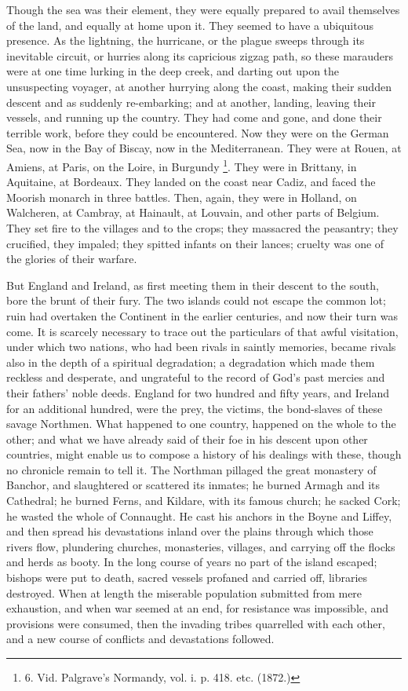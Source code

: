 Though the sea was their
element, they were equally prepared to avail themselves of the land,
and equally at home upon it. They seemed to have a ubiquitous
presence. As the lightning, the hurricane, or the plague sweeps
through its inevitable circuit, or hurries along its capricious zigzag
path, so these marauders were at one time lurking in the deep creek,
and darting out upon the unsuspecting voyager, at another hurrying
along the coast, making their sudden descent and as suddenly
re-embarking; and at another, landing, leaving their vessels, and
running up the country. They had come and gone, and done their
terrible work, before they could be encountered. Now they were on the
German Sea, now in the Bay of Biscay, now in the Mediterranean. They
were at Rouen, at Amiens, at Paris, on the Loire, in Burgundy \footnote{6.
Vid. Palgrave's Normandy, vol. i. p. 418. etc. (1872.)}. They were in Brittany, in Aquitaine, at Bordeaux. They landed
on the coast near Cadiz, and faced the Moorish monarch in three
battles. Then, again, they were in Holland, on Walcheren, at Cambray,
at Hainault, at Louvain, and other parts of Belgium. They set fire to
the villages and to the crops; they massacred the peasantry; they
crucified, they impaled; they spitted infants on their lances; cruelty
was one of the glories of their warfare.

But England and Ireland, as
first meeting them in their descent to the south, bore the brunt of
their fury. The two islands could not escape the common lot; ruin had
overtaken the Continent in the earlier centuries, and now their turn
was come. It is scarcely necessary to trace out the particulars of
that awful visitation, under which two nations, who had been rivals in
saintly memories, became rivals also in the depth of a spiritual
degradation; a degradation which made them reckless and
desperate, and ungrateful to the record of God's past mercies and
their fathers' noble deeds. England for two hundred and fifty years,
and Ireland for an additional hundred, were the prey, the victims, the
bond-slaves of these savage Northmen. What happened to one country,
happened on the whole to the other; and what we have already said of
their foe in his descent upon other countries, might enable us to
compose a history of his dealings with these, though no chronicle
remain to tell it. The Northman pillaged the great monastery of
Banchor, and slaughtered or scattered its inmates; he burned Armagh
and its Cathedral; he burned Ferns, and Kildare, with its famous
church; he sacked Cork; he wasted the whole of Connaught. He cast his
anchors in the Boyne and Liffey, and then spread his devastations
inland over the plains through which those rivers flow, plundering
churches, monasteries, villages, and carrying off the flocks and herds
as booty. In the long course of years no part of the island escaped;
bishops were put to death, sacred vessels profaned and carried off,
libraries destroyed. When at length the miserable population submitted
from mere exhaustion, and when war seemed at an end, for resistance
was impossible, and provisions were consumed, then the invading tribes
quarrelled with each other, and a new course of conflicts and
devastations followed.

